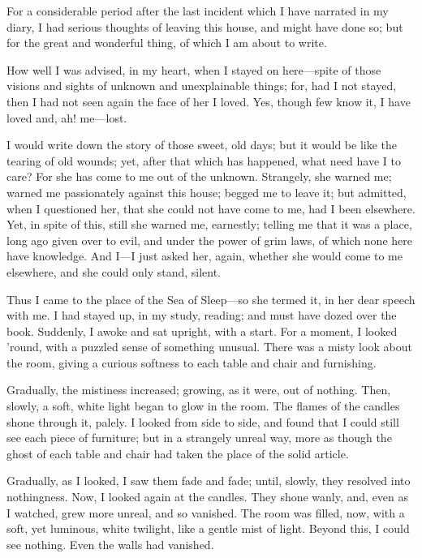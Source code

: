 
\clearpage
\label{ch:08}

\begin{ChapterStart}
\null\null
{}
\end{ChapterStart}

For a considerable period after the last incident which I have narrated in my diary, I had serious thoughts of leaving this house, and might have done so; but for the great and wonderful thing, of which I am about to write.

How well I was advised, in my heart, when I stayed on here---spite of those visions and sights of unknown and unexplainable things; for, had I not stayed, then I had not seen again the face of her I loved. Yes, though few know it, I have loved and, ah! me---lost.

I would write down the story of those sweet, old days; but it would be like the tearing of old wounds; yet, after that which has happened, what need have I to care? For she has come to me out of the unknown. Strangely, she warned me; warned me passionately against this house; begged me to leave it; but admitted, when I questioned her, that she could not have come to me, had I been elsewhere. Yet, in spite of this, still she warned me, earnestly; telling me that it was a place, long ago given over to evil, and under the power of grim laws, of which none here have knowledge. And I---I just asked her, again, whether she would come to me elsewhere, and she could only stand, silent.

Thus I came to the place of the Sea of Sleep---so she termed it, in her dear speech with me. I had stayed up, in my study, reading; and must have dozed over the book. Suddenly, I awoke and sat upright, with a start. For a moment, I looked ’round, with a puzzled sense of something unusual. There was a misty look about the room, giving a curious softness to each table and chair and furnishing.

Gradually, the mistiness increased; growing, as it were, out of nothing. Then, slowly, a soft, white light began to glow in the room. The flames of the candles shone through it, palely. I looked from side to side, and found that I could still see each piece of furniture; but in a strangely unreal way, more as though the ghost of each table and chair had taken the place of the solid article.

Gradually, as I looked, I saw them fade and fade; until, slowly, they resolved into nothingness. Now, I looked again at the candles. They shone wanly, and, even as I watched, grew more unreal, and so vanished. The room was filled, now, with a soft, yet luminous, white twilight, like a gentle mist of light. Beyond this, I could see nothing. Even the walls had vanished.

